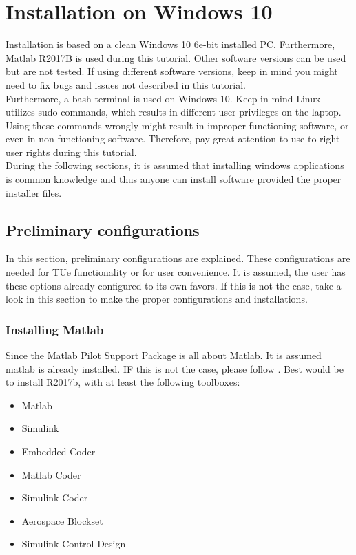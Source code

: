 \chapter{Installation on Windows 10}
Installation is based on a clean Windows 10 6e-bit installed PC. Furthermore, Matlab R2017B is used during this tutorial. Other software versions can be used but are not tested. If using different software versions, keep in mind you might need to fix bugs and issues not described in this tutorial.\\
\newline 
Furthermore, a bash terminal is used on Windows 10. Keep in mind Linux utilizes sudo commands, which results in different user privileges on the laptop. Using these commands wrongly might result in improper functioning software, or even in non-functioning software. Therefore, pay great attention to use to right user rights during this tutorial.\\
\newline
During the following sections, it is assumed that installing windows applications is common knowledge and thus anyone can install software provided the proper installer files.
\section{Preliminary configurations}
In this section, preliminary configurations are explained. These configurations are needed for TUe functionality or for user convenience. It is assumed, the user has these options already configured to its own favors. If this is not the case, take a look in this section to make the proper configurations and installations.
\subsection{Installing Matlab}
Since the Matlab Pilot Support Package is all about Matlab. It is assumed matlab is already installed. IF this is not the case, please follow \cite{MatlabWindows}. Best would be to install R2017b, with at least the following toolboxes:
\begin{itemize}
	\item Matlab
	\item Simulink
	\item Embedded Coder
	\item Matlab Coder
	\item Simulink Coder
	\item Aerospace Blockset
	\item Simulink Control Design
\end{itemize}
